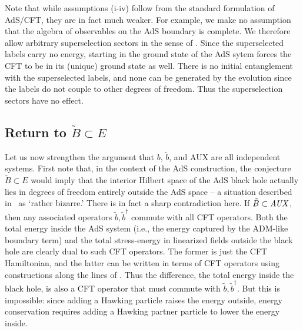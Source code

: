 \documentclass[12pt]{article}
\begin{document}
{{Note that while assumptions (i-iv) follow from the standard formulation of AdS/CFT, they are in fact much weaker.  For example, we make no assumption that the algebra of observables on the AdS boundary is complete.  We therefore allow arbitrary superselection sectors in the sense of \cite{Marolf:2008tx,Marolf:2012xe}.  Since the superselected labels carry no energy, starting in the ground state of the AdS sytem forces the CFT to be in its (unique) ground state as well.  {There is no initial entanglement with the superselected labels, and none can be generated by the evolution since the labels do not couple to other degrees of freedom.} Thus the superselection sectors have no effect.



\label{comp}
\subsection{Return to $\tilde B \subset E$}


{Let us now strengthen the argument that $b$, $\tilde b$, and AUX are all independent systems. First note that, in the context of the AdS construction, the conjecture $\tilde B \subset E$ would imply that the interior Hilbert space of the AdS black hole actually lies in degrees of freedom entirely outside the AdS space -- a situation described in~\cite{Avery:2013exa} as `rather bizarre.'  There is in fact a sharp contradiction here.  If $\tilde B \subset \it AUX$, then any associated operators $\tilde b, \tilde b^\dagger$ commute with all CFT operators.  Both the total energy inside the AdS system (i.e., the energy captured by the ADM-like boundary term) and the total stress-energy in linearized fields outside the black hole are clearly dual to such CFT operators.  The former is just the CFT Hamiltonian, and the latter can be written in terms of CFT operators using constructions along the lines of \cite{Kabat:2011rz,Heemskerk:2012mn}.  Thus the difference, the total energy inside the black hole, is also a CFT operator that must commute with $\tilde b, \tilde b^\dagger$.  But this is impossible:  since adding a Hawking particle raises the energy outside, energy conservation requires adding a Hawking partner particle to lower the energy inside.}


}}
\end{document}
